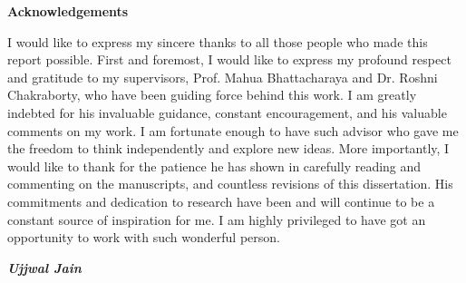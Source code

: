 \begin{center}
{\LARGE \bf Acknowledgements}
\end{center}
\noindent I would like to express my sincere thanks to all those people who made this report possible. First and foremost, I would like to express my profound respect and gratitude to my supervisors, Prof. Mahua Bhattacharaya and Dr. Roshni Chakraborty, who have been guiding force behind this work. I am greatly indebted for his invaluable guidance, constant encouragement, and his valuable comments on my work. I am fortunate enough to have such advisor who gave me the freedom to think independently and explore new ideas. More importantly, I would like to thank for the patience he has shown in carefully reading and commenting on the manuscripts, and countless revisions of this dissertation. His commitments and dedication to research have been and will continue to be a constant source of inspiration for me.
I am highly privileged to have got an opportunity to work with such wonderful person. 
\par  
\begin{flushright}
\textit{\textbf{Ujjwal Jain}}
\end{flushright}



